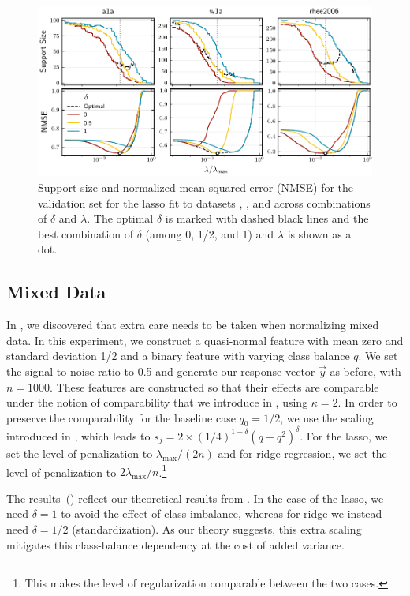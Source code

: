 \begin{figure}[htpb]
  \centering
  \includegraphics[]{plots/hyperopt_paths.pdf}
  \caption{%
    Support size and normalized mean-squared error (NMSE) for the validation set for the lasso fit to datasets , , and  across combinations of \(\delta\) and \(\lambda\). The optimal \(\delta\) is marked with dashed black lines and the best combination of \(\delta\) (among 0, 1/2, and 1) and \(\lambda\) is shown as a dot.
  }
  \label{fig:hyperopt-support}
\end{figure}

\subsection{Mixed Data}\label{sec:experiments-mixed-data}

In , we discovered that extra care needs to be taken when normalizing mixed data. In this experiment, we construct a quasi-normal feature with mean zero and standard deviation 1/2 and a binary feature with varying class balance \(q\). We set the signal-to-noise ratio to 0.5 and generate our response vector \(\vec{y}\) as before, with \(n = \num{1000}\). These features are constructed so that their effects are comparable under the notion of comparability that we introduce in , using \(\kappa = 2\). In order to preserve the comparability for the baseline case \(q_0 = 1/2\), we use the scaling introduced in , which leads to \(s_j = 2 \times (1/4)^{1-\delta}(q-q^2)^\delta\).
For the lasso, we set the level of penalization to \(\lambda_\text{max}/(2n)\) and for ridge regression, we set the level of penalization to \(2\lambda_\text{max}/n\).\footnote{This makes the level of regularization comparable between the two cases.}

The results~() reflect our theoretical results from . In the case of the lasso, we need \(\delta =1\) to avoid the effect of class imbalance, whereas for ridge we instead need \(\delta =1/2\) (standardization). As our theory suggests, this extra scaling mitigates this class-balance dependency at the cost of added variance.


